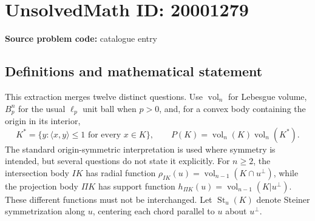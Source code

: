\documentclass[11pt]{article}
\begin{document}
\section*{UnsolvedMath ID: 20001279}
\textbf{Source problem code:} catalogue entry
\subsection{Definitions and mathematical statement}
This extraction merges twelve distinct questions. Use $\operatorname{vol}_n$ for Lebesgue volume, $B_p^n$ for the usual $\ell_p$ unit ball when $p>0$, and, for a convex body containing the origin in its interior,
\[
 K^*=\{y:\langle x,y\rangle\leq1\text{ for every }x\in K\},\qquad
 P(K)=\operatorname{vol}_n(K)\operatorname{vol}_n(K^*).
\]
The standard origin-symmetric interpretation is used where symmetry is intended, but several questions do not state it explicitly. For $n\geq2$, the intersection body $IK$ has radial function $\rho_{IK}(u)=\operatorname{vol}_{n-1}(K\cap u^\perp)$, while the projection body $\Pi K$ has support function $h_{\Pi K}(u)=\operatorname{vol}_{n-1}(K|u^\perp)$. These different functions must not be interchanged. Let $\operatorname{St}_u(K)$ denote Steiner symmetrization along $u$, centering each chord parallel to $u$ about $u^\perp$.
\end{document}
